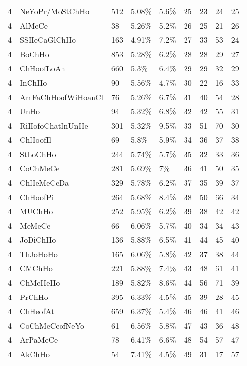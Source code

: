 \begin{longtable}{lllllrrrr}
  4 & NeYoPr/MoStChHo & 512 & 5.08\% & 5.6\% &  25 &  23 &  24 &  25 \\ 
  4 & AlMeCe & 38 & 5.26\% & 5.2\% &  26 &  25 &  21 &  26 \\ 
  4 & SSHeCaGlChHo & 163 & 4.91\% & 7.2\% &  27 &  33 &  53 &  24 \\ 
  4 & BoChHo & 853 & 5.28\% & 6.2\% &  28 &  28 &  29 &  27 \\ 
  4 & ChHoofLoAn & 660 & 5.3\% & 6.4\% &  29 &  29 &  32 &  29 \\ 
  4 & InChHo & 90 & 5.56\% & 4.7\% &  30 &  22 &  16 &  33 \\ 
  4 & AmFaChHoofWiHoanCl & 76 & 5.26\% & 6.7\% &  31 &  40 &  54 &  28 \\ 
  4 & UnHo & 94 & 5.32\% & 6.8\% &  32 &  42 &  55 &  31 \\ 
  4 & RiHofoChatInUnHe & 301 & 5.32\% & 9.5\% &  33 &  51 &  70 &  30 \\ 
  4 & ChHoofIl & 69 & 5.8\% & 5.9\% &  34 &  36 &  37 &  38 \\ 
  4 & StLoChHo & 244 & 5.74\% & 5.7\% &  35 &  32 &  33 &  36 \\ 
  4 & CoChMeCe & 281 & 5.69\% & 7\% &  36 &  41 &  50 &  35 \\ 
  4 & ChHeMeCeDa & 329 & 5.78\% & 6.2\% &  37 &  35 &  39 &  37 \\ 
  4 & ChHoofPi & 264 & 5.68\% & 8.4\% &  38 &  50 &  66 &  34 \\ 
  4 & MUChHo & 252 & 5.95\% & 6.2\% &  39 &  38 &  42 &  42 \\ 
  4 & MeMeCe & 66 & 6.06\% & 5.7\% &  40 &  34 &  34 &  43 \\ 
  4 & JoDiChHo & 136 & 5.88\% & 6.5\% &  41 &  44 &  45 &  40 \\ 
  4 & ThJoHoHo & 165 & 6.06\% & 5.8\% &  42 &  37 &  38 &  44 \\ 
  4 & CMChHo & 221 & 5.88\% & 7.4\% &  43 &  48 &  61 &  41 \\ 
  4 & ChMeHeHo & 189 & 5.82\% & 8.6\% &  44 &  56 &  71 &  39 \\ 
  4 & PrChHo & 395 & 6.33\% & 4.5\% &  45 &  39 &  28 &  45 \\ 
  4 & ChHeofAt & 659 & 6.37\% & 5.4\% &  46 &  46 &  41 &  46 \\ 
  4 & CoChMeCeofNeYo & 61 & 6.56\% & 5.8\% &  47 &  43 &  36 &  48 \\ 
  4 & ArPaMeCe & 78 & 6.41\% & 6.6\% &  48 &  54 &  57 &  47 \\ 
  4 & AkChHo & 54 & 7.41\% & 4.5\% &  49 &  31 &  17 &  57 \\ 

\end{longtable}
